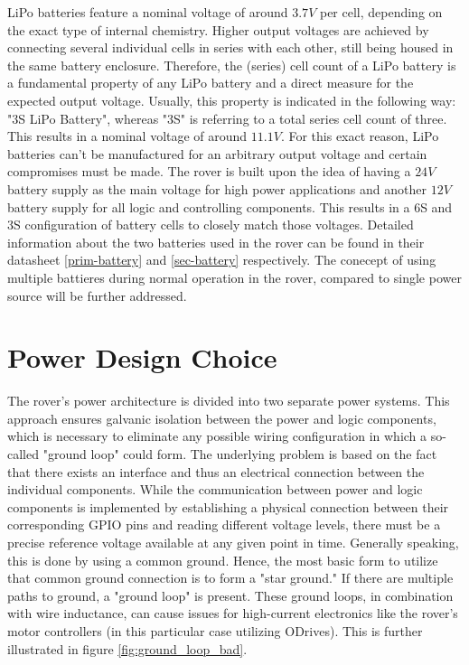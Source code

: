     \vspace{5mm} %
    
    LiPo batteries feature a nominal voltage of around $3.7V$ per cell, depending on the exact type of internal chemistry. Higher output voltages are achieved by connecting several individual cells in series with each other, still being housed in the same battery enclosure. Therefore, the (series) cell count of a LiPo battery is a fundamental property of any LiPo battery and a direct measure for the expected output voltage. Usually, this property is indicated in the following way: "3S LiPo Battery", whereas "3S" is referring to a total series cell count of three. This results in a nominal voltage of around $11.1V$. For this exact reason, LiPo batteries can't be manufactured for an arbitrary output voltage and certain compromises must be made. The rover is built upon the idea of having a $24V$ battery supply as the main voltage for high power applications and another $12V$ battery supply for all logic and controlling components. This results in a 6S and 3S configuration of battery cells to closely match those voltages. Detailed information about the two batteries used in the rover can be found in their datasheet \ref{prim-battery} and \ref{sec-battery} respectively. The conecept of using multiple battieres during normal operation in the rover, compared to single power source will be further addressed.

    \clearpage %
    
\section{Power Design Choice}

    The rover's power architecture is divided into two separate power systems. This approach ensures galvanic isolation between the power and logic components, which is necessary to eliminate any possible wiring configuration in which a so-called "ground loop" could form. The underlying problem is based on the fact that there exists an interface and thus an electrical connection between the individual components. While the communication between power and logic components is implemented by establishing a physical connection between their corresponding GPIO pins and reading different voltage levels, there must be a precise reference voltage available at any given point in time. Generally speaking, this is done by using a common ground. Hence, the most basic form to utilize that common ground connection is to form a "star ground." If there are multiple paths to ground, a "ground loop" is present. These ground loops, in combination with wire inductance, can cause issues for high-current electronics like the rover's motor controllers (in this particular case utilizing ODrives). This is further illustrated in figure \ref{fig:ground_loop_bad}.
    
